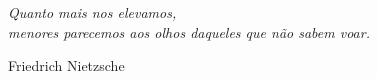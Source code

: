 \begin{agradecimentos}






\end{agradecimentos}

\begin{epigrafe}
    \vspace*{\fill}
	\begin{flushright}
		\textit{Quanto mais nos elevamos,\\
		menores parecemos aos olhos daqueles que não sabem voar.}
        
        Friedrich Nietzsche
	\end{flushright}
\end{epigrafe}
